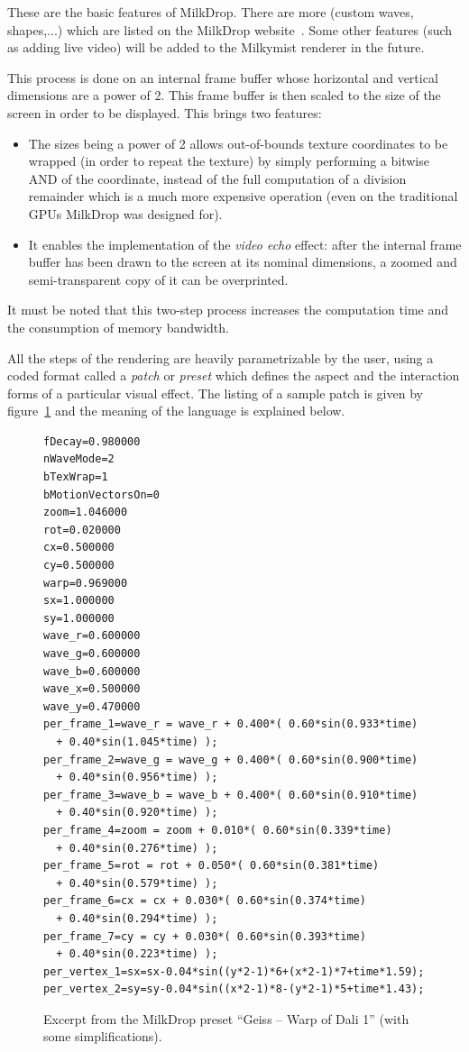 \documentclass[a4paper,11pt]{kthesis}
\begin{document}
These are the basic features of MilkDrop. There are more (custom waves, shapes,...) which are listed on the MilkDrop website~\cite{milkdrop}. Some other features (such as adding live video) will be added to the Milkymist renderer in the future.

This process is done on an internal frame buffer whose horizontal and vertical dimensions are a power of 2. This frame buffer is then scaled to the size of the screen in order to be displayed. This brings two features:
\begin{itemize}
\item The sizes being a power of 2 allows out-of-bounds texture coordinates to be wrapped (in order to repeat the texture) by simply performing a bitwise AND of the coordinate, instead of the full computation of a division remainder which is a much more expensive operation (even on the traditional GPUs MilkDrop was designed for).
\item It enables the implementation of the \textit{video echo} effect: after the internal frame buffer has been drawn to the screen at its nominal dimensions, a zoomed and semi-transparent copy of it can be overprinted.
\end{itemize}
It must be noted that this two-step process increases the computation time and the consumption of memory bandwidth.

All the steps of the rendering are heavily parametrizable by the user, using a coded format called a \textit{patch} or \textit{preset} which defines the aspect and the interaction forms of a particular visual effect. The listing of a sample patch is given by figure~\ref{fig:samplepatch} and the meaning of the language is explained below.

\begin{figure}
\centering
\begin{boxedminipage}{13cm}
\begin{verbatim}
fDecay=0.980000
nWaveMode=2
bTexWrap=1
bMotionVectorsOn=0
zoom=1.046000
rot=0.020000
cx=0.500000
cy=0.500000
warp=0.969000
sx=1.000000
sy=1.000000
wave_r=0.600000
wave_g=0.600000
wave_b=0.600000
wave_x=0.500000
wave_y=0.470000
per_frame_1=wave_r = wave_r + 0.400*( 0.60*sin(0.933*time)
  + 0.40*sin(1.045*time) );
per_frame_2=wave_g = wave_g + 0.400*( 0.60*sin(0.900*time)
  + 0.40*sin(0.956*time) );
per_frame_3=wave_b = wave_b + 0.400*( 0.60*sin(0.910*time)
  + 0.40*sin(0.920*time) );
per_frame_4=zoom = zoom + 0.010*( 0.60*sin(0.339*time)
  + 0.40*sin(0.276*time) );
per_frame_5=rot = rot + 0.050*( 0.60*sin(0.381*time)
  + 0.40*sin(0.579*time) );
per_frame_6=cx = cx + 0.030*( 0.60*sin(0.374*time)
  + 0.40*sin(0.294*time) );
per_frame_7=cy = cy + 0.030*( 0.60*sin(0.393*time)
  + 0.40*sin(0.223*time) );
per_vertex_1=sx=sx-0.04*sin((y*2-1)*6+(x*2-1)*7+time*1.59);
per_vertex_2=sy=sy-0.04*sin((x*2-1)*8-(y*2-1)*5+time*1.43);
\end{verbatim}
\end{boxedminipage}
\caption{Excerpt from the MilkDrop preset ``Geiss -- Warp of Dali 1'' (with some simplifications).}
\label{fig:samplepatch}
\end{figure}
\end{document}

